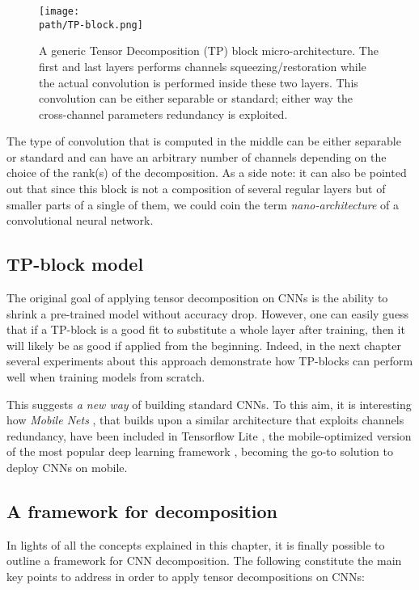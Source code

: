 \begin{figure}[h!]
 \centering
 \texttt{[image: \\path/TP-block.png]} 
 \caption{A generic Tensor Decomposition (TP) block micro-architecture. The first and last layers performs channels squeezing/restoration while the actual convolution is performed inside these two layers. This convolution can be either separable or standard; either way the cross-channel parameters redundancy is exploited. }
 \label{fig:TP-block}
\end{figure}

The type of convolution that is computed in the middle can be either separable or standard and can have an arbitrary number of channels depending on the choice of the rank(s) of the decomposition. 
\newline 
As a side note: it can also be pointed out that since this block is not a composition of several regular layers but of smaller parts of a single of them, we could coin the term \emph{nano-architecture} of a convolutional neural network. 

\newpage
\subsection{TP-block model}
The original goal of applying tensor decomposition on CNNs is the ability to shrink a pre-trained model without accuracy drop. However, one can easily guess that if a TP-block is a good fit to substitute a whole layer after training, then it will likely be as good if applied from the beginning. 
\newline
Indeed, in the next chapter several experiments about this approach demonstrate how TP-blocks can perform well when training models from scratch. 
\newline 


This suggests \emph{a new way} of building standard CNNs. To this aim, it is interesting how \emph{Mobile Nets} \parencite{mobilenets}, that builds upon a similar architecture that exploits channels redundancy, have been included in Tensorflow Lite \parencite{WTFlite}, the mobile-optimized version of the most popular deep learning framework \parencite{tensorflow}, becoming the go-to solution to deploy CNNs on mobile.  


\subsection{A framework for decomposition}
\label{subsec:framework}
In lights of all the concepts explained in this chapter, it is finally possible to outline a framework for CNN decomposition. The following constitute the main key points to address in order to apply tensor decompositions on CNNs: 

